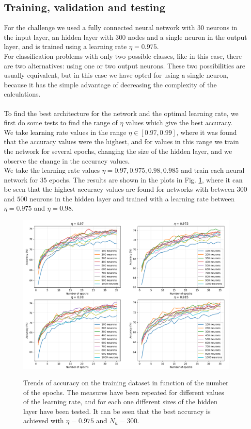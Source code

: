 \documentclass[12pt]{article}
\begin{document}
\subsection{Training, validation and testing}
For the challenge we used a fully connected neural network with $30$ neurons in the input layer, an hidden 
layer with $300$ nodes and a single neuron in the output layer, and is trained using a learning rate 
$\eta = 0.975$. \\
For classification problems with only two possible classes, like in this case, there are two alternatives: 
using one or two output neurons. These two possibilities are usually e\-qui\-va\-lent, but in this case 
we have opted for using a single neuron, because it has the simple advantage of decreasing the complexity 
of the calculations. \\ \\
To find the best architecture for the network and the optimal learning rate, we first do some tests to find 
the range of $\eta$ values which give the best accuracy. \\
We take learning rate values in the range $\eta \in [0.97, 0.99]$, where it was found that the accuracy
values were the highest, and for values in this range we train the network for several epochs, changing the
size of the hidden layer, and we observe the change in the accuracy values. \\
We take the learning rate values $\eta = 0.97, 0.975, 0.98, 0.985$ and train each neural network for $35$ 
epochs. The results are shown in the plots in Fig. \ref{accuracy_plots}, where it can be seen that the 
highest accuracy values are found for networks with between $300$ and $500$ neurons in the hidden layer
and trained with a learning rate between $\eta = 0.975$ and $\eta = 0.98$. \\
\begin{figure}
  \centering
  \includegraphics[scale=0.35]{./img/accuracy_plots.png}
  \label{accuracy_plots}
  \caption{Trends of accuracy on the training dataset in function of the number of the epochs. The measures
  have been repeated for different values of the learning rate, and for each one different sizes of the 
  hidden layer have been tested. It can be seen that the best accuracy is achieved with $\eta = 0.975$ and
  $N_h = 300$.}
\end{figure}
\end{document}
